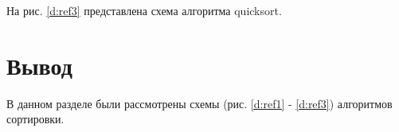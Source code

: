 На рис. \ref{d:ref3} представлена схема алгоритма quicksort.

\begin{figure}[ht!]
\end{figure}


\section{Вывод}

В данном разделе были рассмотрены схемы (рис. \ref{d:ref1} - \ref{d:ref3}) алгоритмов сортировки.






